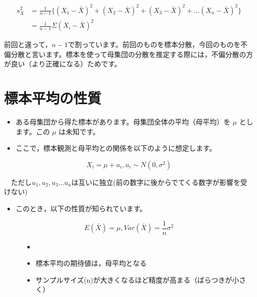 \documentclass[
  letterpaper,
  DIV=11,
  numbers=noendperiod]{scrreprt}
\providecommand{\tightlist}{%
  \setlength{\itemsep}{0pt}\setlength{\parskip}{0pt}}\usepackage{longtable,booktabs,array}
\begin{document}
\[
\begin{split}
s_X^2 &= \frac{1}{n-1}\{(X_1 - \bar X)^2+(X_2 - \bar X)^2+(X_3 - \bar X)^2+...(X_n - \bar X)^2 \} \\ &= \frac{1}{n-1}\Sigma (X_i - \bar X)^2
\end{split}
\]

\begin{tcolorbox}[enhanced jigsaw, breakable, arc=.35mm, colframe=quarto-callout-caution-color-frame, bottomrule=.15mm, colback=white, left=2mm, leftrule=.75mm, opacityback=0, rightrule=.15mm, toprule=.15mm]

前回と違って，\(n-1\)で割っています。前回のものを標本分散，今回のものを不偏分散と言います。標本を使って母集団の分散を推定する際には，不偏分散の方が良い（より正確になる）ためです。

\end{tcolorbox}

\hypertarget{ux6a19ux672cux5e73ux5747ux306eux6027ux8cea}{%
\section{標本平均の性質}\label{ux6a19ux672cux5e73ux5747ux306eux6027ux8cea}}

\begin{itemize}
\item
  ある母集団から得た標本があります。母集団全体の平均（母平均）を \(\mu\)
  とします。この \(\mu\) は未知です。
\item
  ここで，標本観測と母平均との関係を以下のように想定します。
\end{itemize}

\[
X_i = \mu+u_i, u_i  \sim N(0,\sigma ^2)
\]

　ただし\(u_1,u_2,u_3...u_n\)は互いに独立(前の数字に後からでてくる数字が影響を受けない)

\begin{itemize}
\tightlist
\item
  このとき，以下の性質が知られています。
\end{itemize}

\begin{description}
\item[\[E(\bar X) = \mu, Var(\bar X) = \frac{1}{n}\sigma^2\]]
\begin{itemize}
\item[]
\item
  標本平均の期待値は，母平均となる
\item
  サンプルサイズ(n)が大きくなるほど精度が高まる（ばらつきが小さく）
\end{itemize}
\end{description}
\end{document}
